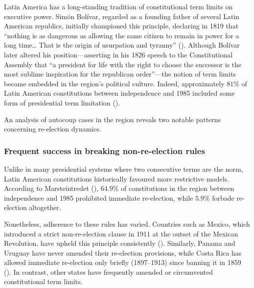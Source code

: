 \documentclass[
  12pt,
]{report}
\begin{document}
Latin America has a long-standing tradition of constitutional term
limits on executive power. Simón Bolívar, regarded as a founding father
of several Latin American republics, initially championed this
principle, declaring in 1819 that ``nothing is as dangerous as allowing
the same citizen to remain in power for a long time\ldots{} That is the
origin of usurpation and tyranny'' (). Although Bolívar later altered his
position---asserting in his 1826 speech to the Constitutional Assembly
that ``a president for life with the right to choose the successor is
the most sublime inspiration for the republican order''---the notion of
term limits became embedded in the region's political culture. Indeed,
approximately \(81\%\) of Latin American constitutions between
independence and 1985 included some form of presidential term limitation
().

An analysis of autocoup cases in the region reveals two notable patterns
concerning re-election dynamics.

\subsubsection*{Frequent success in breaking non-re-election
rules}\label{frequent-success-in-breaking-non-re-election-rules}

Unlike in many presidential systems where two consecutive terms are the
norm, Latin American constitutions historically favoured more
restrictive models. According to Marsteintredet
(), \(64.9\%\) of constitutions
in the region between independence and 1985 prohibited immediate
re-election, while \(5.9\%\) forbade re-election altogether.

Nonetheless, adherence to these rules has varied. Countries such as
Mexico, which introduced a strict non-re-election clause in 1911 at the
outset of the Mexican Revolution, have upheld this principle
consistently (). Similarly,
Panama and Uruguay have never amended their re-election provisions,
while Costa Rica has allowed immediate re-election only briefly
(1897--1913) since banning it in 1859
(). In contrast,
other states have frequently amended or circumvented constitutional term
limits.
\end{document}
